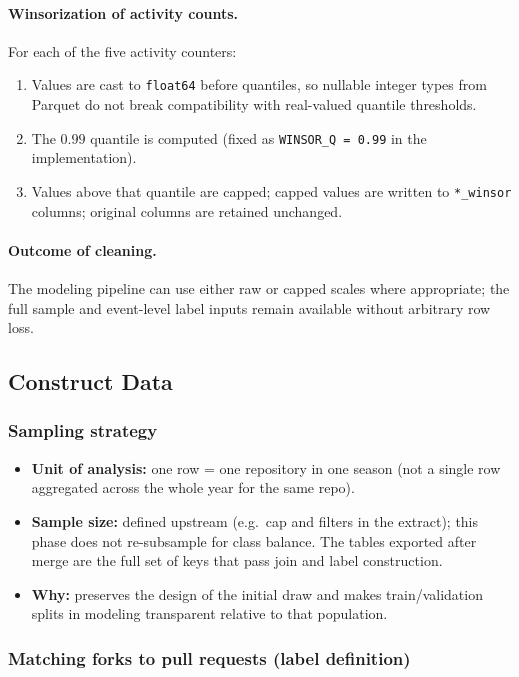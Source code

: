 \paragraph{Winsorization of activity counts.}
For each of the five activity counters:
\begin{enumerate}
  \item Values are cast to \texttt{float64} before quantiles, so nullable integer types from Parquet do not break compatibility with real-valued quantile thresholds.
  \item The $0.99$ quantile is computed (fixed as \texttt{WINSOR\_Q = 0.99} in the implementation).
  \item Values above that quantile are capped; capped values are written to \texttt{*\_winsor} columns; original columns are retained unchanged.
\end{enumerate}

\paragraph{Outcome of cleaning.}
The modeling pipeline can use either raw or capped scales where appropriate; the full sample and event-level label inputs remain available without arbitrary row loss.


\subsection{Construct Data}

\subsubsection{Sampling strategy}

\begin{itemize}
  \item \textbf{Unit of analysis:} one row = one repository in one season (not a single row aggregated across the whole year for the same repo).
  \item \textbf{Sample size:} defined upstream (e.g.\ cap and filters in the extract); this phase does not re-subsample for class balance. The tables exported after merge are the full set of keys that pass join and label construction.
  \item \textbf{Why:} preserves the design of the initial draw and makes train/validation splits in modeling transparent relative to that population.
\end{itemize}

\subsubsection{Matching forks to pull requests (label definition)}

